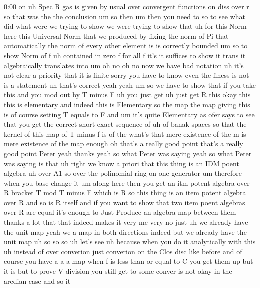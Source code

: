 \begin{unfinished}{0:00}
on  uh
Spec  R  gas  is  given  by
usual  over  convergent
functions  on
diss  over
r  so  that  was  the  the
conclusion
um  so  then
um  then  you  need  to  so  to  see  what  did
what  were  we  trying  to  show  we  were
trying  to  show  that  uh  for  this  Norm
here  this  Universal  Norm  that  we
produced  by  fixing  the  norm  of  Pi  that
automatically  the  norm  of  every  other
element  is  is  correctly  bounded  um  so  to
show  Norm  of  f  uh  contained  in  zero  f
for  all  f  it's  it  suffices  to
show  it  trans  it  algebraically
translates  into
um  oh  no  oh  no  now  we  have  bad
notation
uh  it's  not  clear  a  priority  that  it  is
finite  sorry  you  have  to  know  even  the
finess  is  not  is  a  statement  uh  that's
correct  yeah  yeah  um  so  we  have  to  show
that  if  you  take  this  and  you  mod  out  by
T  minus  F  uh  you  just  get  uh  just  get  R
this  okay  this  this  is  elementary  and
indeed  this  is  Elementary  so  the  map  the
map  giving  this  is  of  course  setting  T
equals  to
F  and  um  it's  quite  Elementary  as  ofer
says  to  see  that  you  get  the  correct
short  exact  sequence  of  uh  of  banak
spaces  so  that  the  kernel  of  this  map  of
T  minus
f  is  of  the  what's
that  mere  existence  of  the  m  is  mere
existence  of  the  map
enough  oh  that's  a  really  good  point
that's  a  really  good  point  Peter  yeah
thanks  yeah  so  what  Peter  was  saying
yeah  so  what  Peter  was  saying  is  that
uh  right  we  know  a  priori  that  this
thing  is  an  IDM  poent
algebra  uh  over  A1  so  over  the
polinomial  ring  on  one  generator  um
therefore  when  you  base  change  it  um
along  here  then  you  get  an  itm  potent
algebra  over  R  bracket  T  mod  T  minus  F
which  is  R  so  this  thing  is  an  item
potent  algebra  over  R  and  so  is  R  itself
and  if  you  want  to  show  that  two  item
poent  algebras  over  R  are  equal  it's
enough  to  Just  Produce  an  algebra  map
between  them  thanks  a  lot  that  that
indeed  makes  it  very  me  very  no  just  uh
we  already  have  the  unit  map  yeah  we  a
map  in  both  directions  indeed  but  we
already  have  the  unit  map  uh  so
so  so  uh  let's  see  uh  because  when  you
do  it  analytically  with  this  uh  instead
of  over  converion  just  converion  on  the
Clos  disc  like  before  and  of  course  you
have  a  a  a  map
when  f  is  less  than  or  equal  to  C  you
get  them  up  but  it  is  but  to  prove  V
division  you  still  get  to  some  conver  is
not  okay  in  the  aredian  case  and  so  it

\end{unfinished}
